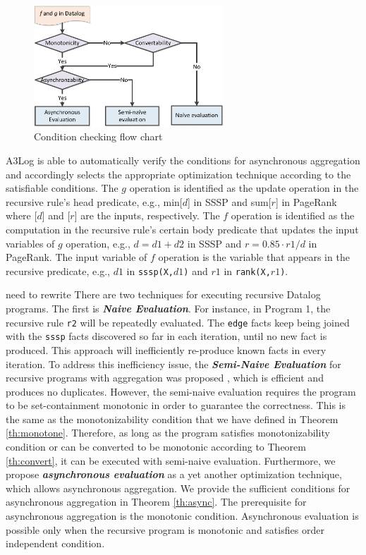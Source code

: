 \begin{figure}[!t]
	\centering
	\includegraphics[width=2.8in]{fig/flow}
	\vspace{-0.1in}
	\caption{Condition checking flow chart}
	\label{fig:flow}
	\vspace{-0.2in}
\end{figure}

A3Log is able to automatically verify the conditions for asynchronous aggregation and accordingly selects the appropriate optimization technique according to the satisfiable conditions. The $g$ operation is identified as the update operation in the recursive rule's head predicate, e.g., min[$d$] in SSSP and sum[$r$] in PageRank where [$d$] and [$r$] are the inputs, respectively. The $f$ operation is identified as the computation in the recursive rule's certain body predicate that updates the input variables of $g$ operation, e.g., $d=d1+d2$ in SSSP and $r=0.85\cdot r1/d$ in PageRank. The input variable of $f$ operation is the variable that appears in the recursive predicate, e.g., $d1$ in \texttt{sssp(X,$d1$)} and $r1$ in \texttt{rank(X,$r1$)}.


need to rewrite
There are two techniques for executing recursive Datalog programs. The first is \emph{\textbf{Naive Evaluation}}. For instance, in Program 1, the recursive rule \texttt{r2} will be repeatedly evaluated. The \texttt{edge} facts keep being joined with the \texttt{sssp} facts discovered so far in each iteration, until no new fact is produced. This approach will inefficiently re-produce known facts in every iteration. To address this inefficiency issue, the \emph{\textbf{Semi-Naive Evaluation}} for recursive programs with aggregation was proposed \cite{Lam:2013:SDE:2510649.2511289,Wang:2015:AFR:2824032.2824052}, which is efficient and produces no duplicates. However, the semi-naive evaluation requires the program to be set-containment monotonic in order to guarantee the correctness. This is the same as the monotonizability condition that we have defined in Theorem \ref{th:monotone}. Therefore, as long as the program satisfies monotonizability condition or can be converted to be monotonic according to Theorem \ref{th:convert}, it can be executed with semi-naive evaluation. Furthermore, we propose \emph{\textbf{asynchronous evaluation}} as a yet another optimization technique, which allows asynchronous aggregation. We provide the sufficient conditions for asynchronous aggregation in Theorem \ref{th:async}. The prerequisite for asynchronous aggregation is the monotonic condition. Asynchronous evaluation is possible only when the recursive program is monotonic and satisfies order independent condition.

